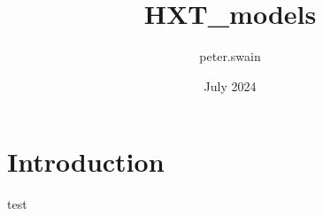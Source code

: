 \documentclass{article}
\title{HXT_models}
\author{peter.swain }
\date{July 2024}
\begin{document}
\maketitle

\section{Introduction}
test 
\end{document}
